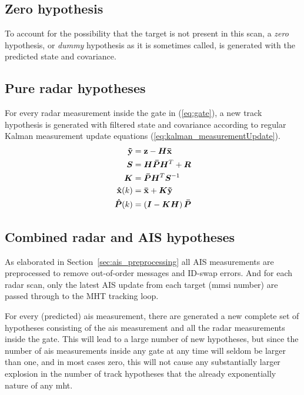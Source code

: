 \subsection{Zero hypothesis}
To account for the possibility that the target is not present in this scan, a \emph{zero} hypothesis, or \emph{dummy} hypothesis as it is sometimes called, is generated with the predicted state and covariance.

\subsection{Pure radar hypotheses}
For every radar measurement inside the gate in (\ref{eq:gate}), a new track hypothesis is generated with filtered state and covariance according to regular Kalman measurement update equations (\ref{eq:kalman_measurementUpdate}).
\begin{equation}
\begin{split}
\boldsymbol{\mathbf{\tilde{y}}}	&= \boldsymbol{\mathbf{z}} - \bm{H} \boldsymbol{\mathbf{\bar{x}}} \\
\bm{S}			&= \bm{H} \bm{\bar{P}} \bm{H}^T + \bm{R} \\
\bm{K} 			&= \bm{\bar{P}} \bm{H}^T \bm{S}^{-1} \\
\boldsymbol{\mathbf{\hat{x}}}(k) 	&= \boldsymbol{\mathbf{\bar{x}}} + \bm{K} \boldsymbol{\mathbf{\tilde{y}}} \\
\bm{\hat{P}}(k) 	&= \left( \bm{I} - \bm{K} \bm{H} \right) \bm{\bar{P}}
\end{split}
\label{eq:kalman_measurementUpdate}
\end{equation}

\subsection{Combined radar and AIS hypotheses}\label{subsec:combined_radar_and_ais_hypotheses}
As elaborated in Section~\ref{sec:ais_preprocessing} all AIS measurements are preprocessed to remove out-of-order messages and ID-swap errors. And for each radar scan, only the latest AIS update from each target (\gls{mmsi} number) are passed through to the MHT tracking loop.

For every (predicted) \gls{ais} measurement, there are generated a new complete set of hypotheses consisting of the \gls{ais} measurement and all the radar measurements inside the gate. This will lead to a large number of new hypotheses, but since the number of \gls{ais} measurements inside any gate at any time will seldom be larger than one, and in most cases zero, this will not cause any substantially larger explosion in the number of track hypotheses that the already exponentially nature of any \gls{mht}.%

